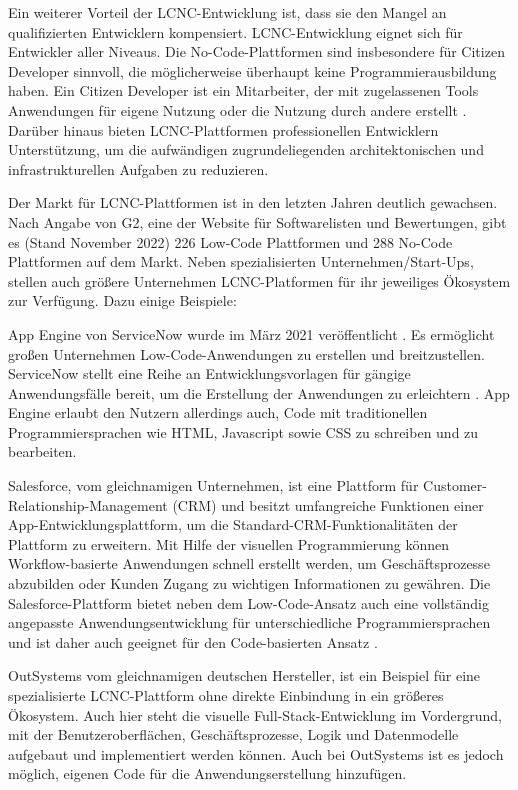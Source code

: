 Ein weiterer Vorteil der LCNC-Entwicklung ist, dass sie den Mangel an qualifizierten Entwicklern kompensiert. LCNC-Entwicklung eignet sich für Entwickler aller Niveaus. Die No-Code-Plattformen sind insbesondere für Citizen Developer sinnvoll, die möglicherweise überhaupt keine Programmierausbildung haben. Ein Citizen Developer ist ein Mitarbeiter, der mit zugelassenen Tools Anwendungen für eigene Nutzung oder die Nutzung durch andere erstellt \cite{lcnc:citidev}. Darüber hinaus bieten LCNC-Plattformen professionellen Entwicklern Unterstützung, um die aufwändigen zugrundeliegenden architektonischen und infrastrukturellen Aufgaben zu reduzieren.

Der Markt für LCNC-Plattformen ist in den letzten Jahren deutlich gewachsen. Nach Angabe von G2, eine der Website für Softwarelisten und Bewertungen, gibt es (Stand November 2022) 226 Low-Code Plattformen \cite{lcnc:llcdpa} und 288 No-Code Plattformen \cite{lcnc:lncdpa} auf dem Markt. Neben spezialisierten Unternehmen/Start-Ups, stellen auch größere Unternehmen LCNC-Platformen für ihr jeweiliges Ökosystem zur Verfügung. Dazu einige Beispiele:

App Engine von ServiceNow wurde im März 2021 veröffentlicht \cite{lcnc:aesrn}. Es ermöglicht großen Unternehmen Low-Code-Anwendungen zu erstellen und breitzustellen. ServiceNow stellt eine Reihe an Entwicklungsvorlagen für gängige Anwendungsfälle bereit, um die Erstellung der Anwendungen zu erleichtern \cite{lcnc:snflc}. App Engine erlaubt den Nutzern allerdings auch, Code mit traditionellen Programmiersprachen wie HTML, Javascript sowie CSS zu schreiben und zu bearbeiten.

Salesforce, vom gleichnamigen Unternehmen, ist eine Plattform für Customer-Relationship-Management (CRM) und besitzt umfangreiche Funktionen einer App-Entwicklungsplattform, um die Standard-CRM-Funktionalitäten der Plattform zu erweitern. Mit Hilfe der visuellen Programmierung können Workflow-basierte Anwendungen schnell erstellt werden, um Geschäftsprozesse abzubilden oder Kunden Zugang zu wichtigen Informationen zu gewähren. Die Salesforce-Plattform bietet neben dem Low-Code-Ansatz auch eine vollständig angepasste Anwendungsentwicklung für unterschiedliche Programmiersprachen und ist daher auch geeignet für den Code-basierten Ansatz \cite{lcnc:sfpr}.

OutSystems vom gleichnamigen deutschen Hersteller, ist ein Beispiel für eine spezialisierte LCNC-Plattform ohne direkte Einbindung in ein größeres Ökosystem. Auch hier steht die visuelle Full-Stack-Entwicklung im Vordergrund, mit der Benutzeroberflächen, Geschäftsprozesse, Logik und Datenmodelle aufgebaut und implementiert werden können. Auch bei OutSystems ist es jedoch möglich, eigenen Code für die Anwendungserstellung hinzufügen.

